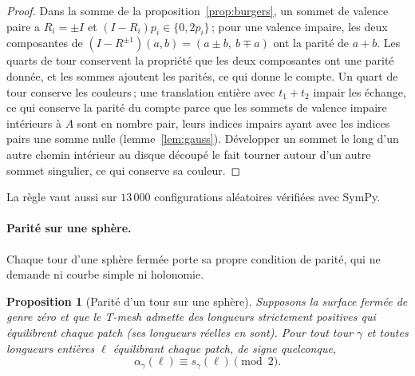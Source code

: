 \documentclass[11pt,a4paper]{article}
\newtheorem{proposition}{Proposition}
\newcommand{\shift}{s}
\begin{document}
\begin{proof}
Dans la somme de la proposition~\ref{prop:burgers}, un sommet de valence paire
a $R_i = \pm I$ et $(I - R_i)p_i \in \{0, 2p_i\}$\,; pour une valence
impaire, les deux composantes de $(I - R^{\pm1})(a, b) = (a \pm b,\ b \mp a)$
ont la parité de $a + b$. Les quarts de tour conservent la propriété que les
deux composantes ont une parité donnée, et les sommes ajoutent les parités, ce
qui donne le compte. Un quart de tour conserve les couleurs\,; une translation
entière avec $t_1 + t_2$ impair les échange, ce qui conserve la parité du
compte parce que les sommets de valence impaire intérieurs à $A$ sont en
nombre pair, leurs indices impairs ayant avec les indices pairs une somme
nulle (lemme~\ref{lem:gauss}). Développer un sommet le long d'un autre chemin
intérieur au disque découpé le fait tourner autour d'un autre sommet
singulier, ce qui conserve sa couleur.
\end{proof}

La règle vaut aussi sur $13\,000$ configurations aléatoires vérifiées avec
SymPy.

\paragraph{Parité sur une sphère.}
Chaque tour d'une sphère fermée porte sa propre condition de parité, qui ne
demande ni courbe simple ni holonomie.

\begin{proposition}[Parité d'un tour sur une sphère]\label{prop:parity}
Supposons la surface fermée de genre zéro et que le T-mesh admette des
longueurs strictement positives qui équilibrent chaque patch (ses longueurs
réelles en sont). Pour tout tour $\gamma$ et toutes longueurs entières $\ell$
équilibrant chaque patch, de signe quelconque,
\[
  \alpha_\gamma(\ell) \equiv \shift_\gamma(\ell) \pmod 2 .
\]
\end{proposition}
\end{document}
